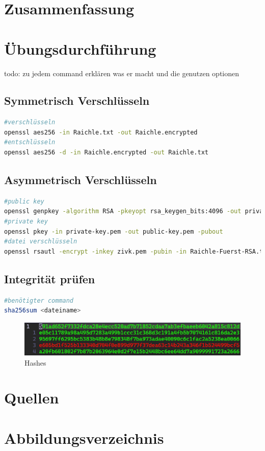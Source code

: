 \documentclass[a4paper]{article}
\begin{document}
\section{Zusammenfassung}


\newpage

\section{Übungsdurchführung}
todo: zu jedem command erklären was er macht und die genutzen optionen
\subsection{Symmetrisch Verschlüsseln}
\begin{lstlisting}[language=bash]
#verschlüsseln
openssl aes256 -in Raichle.txt -out Raichle.encrypted
#entschlüsseln
openssl aes256 -d -in Raichle.encrypted -out Raichle.txt
\end{lstlisting}

\subsection{Asymmetrisch Verschlüsseln}
\begin{lstlisting}[language=bash]
#public key
openssl genpkey -algorithm RSA -pkeyopt rsa_keygen_bits:4096 -out private-key.pem
#private key
openssl pkey -in private-key.pem -out public-key.pem -pubout
#datei verschlüsseln
openssl rsautl -encrypt -inkey zivk.pem -pubin -in Raichle-Fuerst-RSA.txt -out Raichle-Fuerst-RSA.txt.zivk.enc
\end{lstlisting}

\subsection{Integrität prüfen}
\begin{lstlisting}[language=bash]
#benötigter command
sha256sum <dateiname>
\end{lstlisting}

\begin{figure}[h]
	\includegraphics[scale=0.3]{images/hashes.png}
	\caption{Hashes}
\end{figure}



\newpage
\section{Quellen}

\newpage
\section{Abbildungsverzeichnis}

\listoffigures
\end{document}
